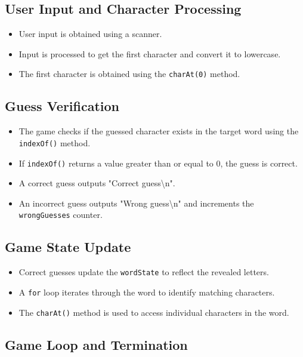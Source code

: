 \documentclass{article}
\begin{document}
\begin{itemize}
\subsection*{User Input and Character Processing}

\begin{itemize}
    \item User input is obtained using a scanner.
    \item Input is processed to get the first character and convert it to lowercase.
    \item The first character is obtained using the \texttt{charAt(0)} method.
\end{itemize}

\subsection*{Guess Verification}

\begin{itemize}
    \item The game checks if the guessed character exists in the target word using the \texttt{indexOf()} method.
    \item If \texttt{indexOf()} returns a value greater than or equal to 0, the guess is correct.
    \item A correct guess outputs "Correct guess\textbackslash{}n".
    \item An incorrect guess outputs "Wrong guess\textbackslash{}n" and increments the \texttt{wrongGuesses} counter.
\end{itemize}

\subsection*{Game State Update}

\begin{itemize}
    \item Correct guesses update the \texttt{wordState} to reflect the revealed letters.
    \item A \texttt{for} loop iterates through the word to identify matching characters.
    \item The \texttt{charAt()} method is used to access individual characters in the word.
\end{itemize}

\subsection*{Game Loop and Termination}


\end{itemize}
\end{document}
